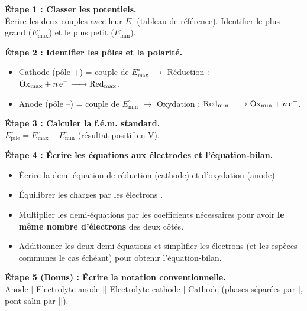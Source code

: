 \documentclass[11pt]{article}
\newcommand{\cle}[1]{{\popxbold\color{popdark}#1}}
\begin{document}
\begin{methode}
\textbf{Étape 1 : Classer les potentiels.} \\
Écrire les deux couples avec leur \cle{$E^\circ$} (tableau de référence). Identifier le plus grand (\cle{$E^\circ_{\max}$}) et le plus petit (\cle{$E^\circ_{\min}$}).

\textbf{Étape 2 : Identifier les pôles et la polarité.} \\
\begin{itemize}
    \item Cathode (pôle +) = couple de \cle{$E^\circ_{\max}$} $\rightarrow$ Réduction : $\ce{Ox_{\max} + n e- -> Red_{\max}}$.
    \item Anode (pôle –) = couple de \cle{$E^\circ_{\min}$} $\rightarrow$ Oxydation : $\ce{Red_{\min} -> Ox_{\min} + n e-}$.
\end{itemize}

\textbf{Étape 3 : Calculer la f.é.m. standard.} \\
\cle{$E^\circ_{\text{pile}} = E^\circ_{\max} - E^\circ_{\min}$} (résultat positif en V).

\textbf{Étape 4 : Écrire les équations aux électrodes et l'équation-bilan.} \\
\begin{itemize}
    \item Écrire la demi-équation de réduction (cathode) et d'oxydation (anode).
    \item Équilibrer les charges par les électrons .
    \item Multiplier les demi-équations par les coefficients nécessaires pour avoir \textbf{le même nombre d'électrons} des deux côtés.
    \item Additionner les deux demi-équations et simplifier les électrons (et les espèces communes le cas échéant) pour obtenir l'équation-bilan.
\end{itemize}

\textbf{Étape 5 (Bonus) : Écrire la notation conventionnelle.} \\
\cle{Anode | Electrolyte anode || Electrolyte cathode | Cathode} (phases séparées par \cle{|}, pont salin par \cle{||}).
\end{methode}
\end{document}
